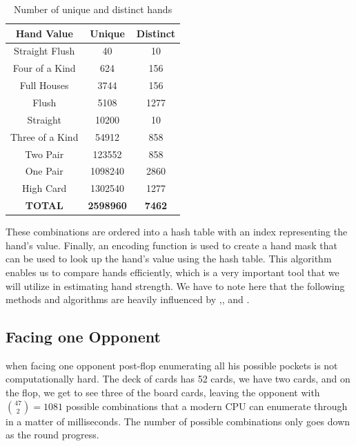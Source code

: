 \begin{table}[h]
    \centering
    \begin{tabular}{|c|c|c|}
        \hline
        \textbf{Hand Value} & \textbf{Unique}  & \textbf{Distinct} \\\hline
        Straight Flush      & 40               & 10                \\\hline
        Four of a Kind      & 624              & 156               \\\hline
        Full Houses         & 3744             & 156               \\\hline
        Flush               & 5108             & 1277              \\\hline
        Straight            & 10200            & 10                \\\hline
        Three of a Kind     & 54912            & 858               \\\hline
        Two Pair            & 123552           & 858               \\\hline
        One Pair            & 1098240          & 2860              \\\hline
        High Card           & 1302540          & 1277              \\\hline
        \textbf{TOTAL}      & \textbf{2598960} & \textbf{7462}     \\\hline
    \end{tabular}
    \caption{Number of unique and distinct hands}
    \label{tab:unique}
\end{table}

These combinations are ordered into a hash table with an index representing the hand's value. Finally, an encoding function is used to create a hand mask that can be used to look up the hand's value using the hash table. This algorithm enables us to compare hands efficiently, which is a very important tool that we will utilize in estimating hand strength. We have to note here that the following methods and algorithms are heavily influenced by \cite{billings_challenge_2002},\cite{papp_dealing_1998}, and \cite{davidson_improved_2000}.


\subsection{Facing one Opponent}
when facing one opponent post-flop enumerating all his possible pockets is not computationally hard. The deck of cards has 52 cards, we have two cards, and on the flop, we get to see three of the board cards, leaving the opponent with ${47 \choose 2} = 1081$ possible combinations that a modern  CPU can enumerate through in a matter of milliseconds. The number of possible combinations only goes down as the round progress.

